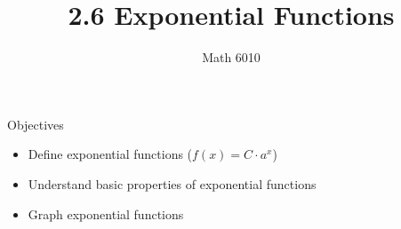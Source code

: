 \documentclass[]{beamer}
\title{2.6 Exponential Functions}
\author{Math 6010}
\institute{9-20-2023}
\date{}
\begin{document}
	\beamertemplatenavigationsymbolsempty
	
	\frame{\titlepage}
	
%		
	
	\begin{frame}{Objectives}
		\begin{itemize}
			\item Define exponential functions ($f(x) = C\cdot a^x$)
			\pause\vfill
			\item Understand basic properties of exponential functions
			\pause\vfill
			\item Graph exponential functions
		\end{itemize}
	\end{frame}
	
\end{document}
